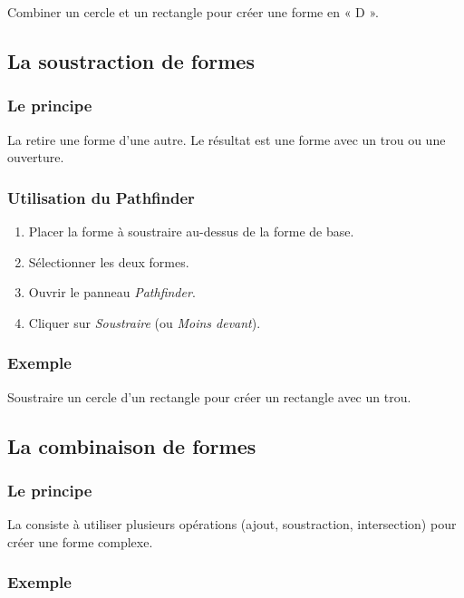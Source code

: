 Combiner un cercle et un rectangle pour créer une forme en « D ».

\subsection{La soustraction de formes}

\subsubsection{Le principe}

La  retire une forme d'une autre. Le résultat est une forme avec un trou ou une ouverture.

\subsubsection{Utilisation du Pathfinder}

\begin{enumerate}
    \item Placer la forme à soustraire au-dessus de la forme de base.
    \item Sélectionner les deux formes.
    \item Ouvrir le panneau \emph{Pathfinder}.
    \item Cliquer sur \emph{Soustraire} (ou \emph{Moins devant}).
\end{enumerate}

\subsubsection{Exemple}

Soustraire un cercle d'un rectangle pour créer un rectangle avec un trou.

\subsection{La combinaison de formes}

\subsubsection{Le principe}

La  consiste à utiliser plusieurs opérations (ajout, soustraction, intersection) pour créer une forme complexe.

\subsubsection{Exemple}

